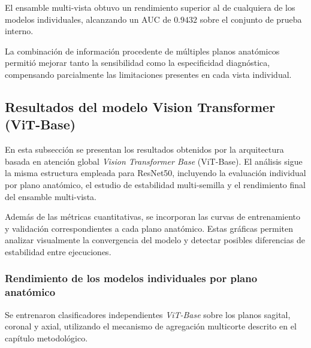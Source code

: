 El ensamble multi-vista obtuvo un rendimiento superior al de cualquiera de los modelos individuales, alcanzando un AUC de $0.9432$ sobre el conjunto de prueba interno.

La combinación de información procedente de múltiples planos anatómicos permitió mejorar tanto la sensibilidad como la especificidad diagnóstica, compensando parcialmente las limitaciones presentes en cada vista individual.





\subsection{Resultados del modelo Vision Transformer (ViT-Base)}
\label{subsec:resultados_vitbase}

En esta subsección se presentan los resultados obtenidos por la arquitectura basada en atención global \textit{Vision Transformer Base} (ViT-Base). El análisis sigue la misma estructura empleada para ResNet50, incluyendo la evaluación individual por plano anatómico, el estudio de estabilidad multi-semilla y el rendimiento final del ensamble multi-vista.

Además de las métricas cuantitativas, se incorporan las curvas de entrenamiento y validación correspondientes a cada plano anatómico. Estas gráficas permiten analizar visualmente la convergencia del modelo y detectar posibles diferencias de estabilidad entre ejecuciones.

\subsubsection{Rendimiento de los modelos individuales por plano anatómico}

Se entrenaron clasificadores independientes \textit{ViT-Base} sobre los planos sagital, coronal y axial, utilizando el mecanismo de agregación multicorte descrito en el capítulo metodológico.

